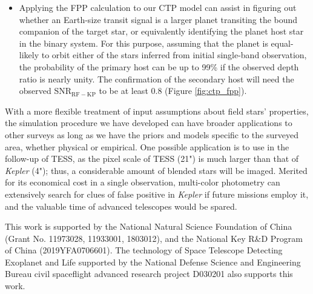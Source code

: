 \documentclass{aastex63}
\begin{document}
\begin{itemize}
    \item Applying the FPP calculation to our CTP model can assist in figuring out whether an Earth-size transit signal is a larger planet transiting the bound companion of the target star, or equivalently identifying the planet host star in the binary system. For this purpose, assuming that the planet is equal-likely to orbit either of the stars inferred from initial single-band observation, the probability of the primary host can be up to 99\% if the observed depth ratio is nearly unity. The confirmation of the secondary host will need the observed SNR$_\mathrm{RF-KP}$ to be at least 0.8 (Figure \ref{fig:ctp_fpp}).
    
\end{itemize}

With a more flexible treatment of input assumptions about field stars' properties, the simulation procedure we have developed can have broader applications to other surveys as long as we have the priors and models specific to the surveyed area, whether physical or empirical. One possible application is to use in the follow-up of TESS, as the pixel scale of TESS (21") is much larger than that of \emph{Kepler} (4"); thus, a considerable amount of blended stars will be imaged. Merited for its economical cost in a single observation, multi-color photometry can extensively search for clues of false positive in \emph{Kepler} if future missions employ it, and the valuable time of advanced telescopes would be spared.

\acknowledgments

This work is supported by the National Natural Science
Foundation of China (Grant No. 11973028, 11933001, 1803012), and the National Key R\&D Program of China (2019YFA0706601). The technology of Space Telescope Detecting Exoplanet and Life supported by the National Defense Science and Engineering Bureau civil spaceflight advanced research project D030201 also supports this work.






\end{document}
